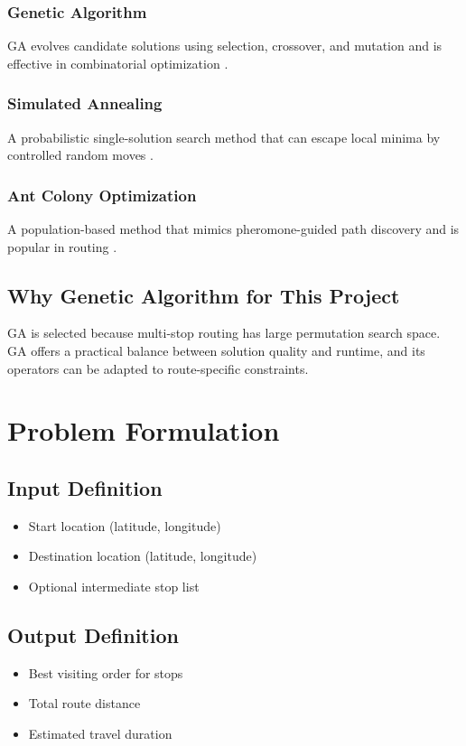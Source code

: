 \documentclass[12pt,a4paper]{report}
\begin{document}
\subsection{Genetic Algorithm}
GA evolves candidate solutions using selection, crossover, and mutation and is effective in combinatorial optimization \cite{goldberg1989,holland1992}.

\subsection{Simulated Annealing}
A probabilistic single-solution search method that can escape local minima by controlled random moves \cite{kirkpatrick1983}.

\subsection{Ant Colony Optimization}
A population-based method that mimics pheromone-guided path discovery and is popular in routing \cite{dorigo1997}.

\section{Why Genetic Algorithm for This Project}
GA is selected because multi-stop routing has large permutation search space. GA offers a practical balance between solution quality and runtime, and its operators can be adapted to route-specific constraints.

\chapter{Problem Formulation}

\section{Input Definition}
\begin{itemize}
    \item Start location (latitude, longitude)
    \item Destination location (latitude, longitude)
    \item Optional intermediate stop list
\end{itemize}

\section{Output Definition}
\begin{itemize}
    \item Best visiting order for stops
    \item Total route distance
    \item Estimated travel duration
\end{itemize}
\end{document}
